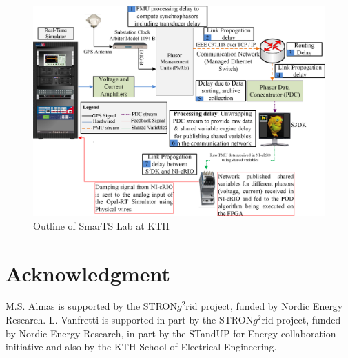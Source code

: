 \documentclass[journal]{IEEEtran}
\begin{document}
\begin{figure}[!t]
\centering
\includegraphics[width=1\linewidth]{./SmarTSlabOutline}
\caption{Outline of SmarTS Lab at KTH}
\label{fig:SmarTSlabOutline}
\end{figure}



\section*{Acknowledgment}
M.S. Almas is supported by the STRON$g^{2}$rid project, funded by Nordic Energy Research.
L. Vanfretti is supported in part by the STRON$g^{2}$rid project, funded by Nordic Energy Research, in part by the STandUP for Energy collaboration initiative and also by the KTH School of Electrical Engineering.

\ifCLASSOPTIONcaptionsoff
  \newpage
\fi




\end{document}
